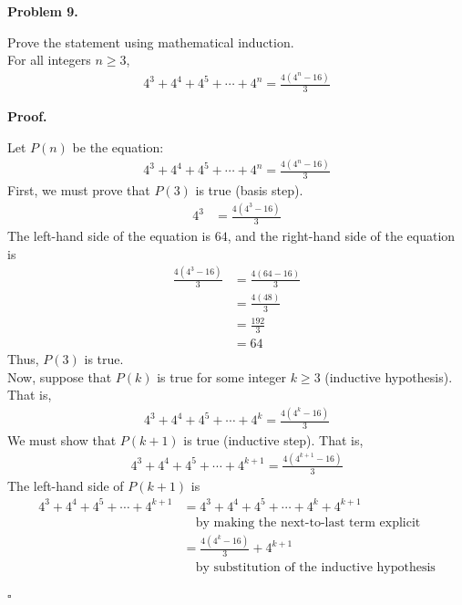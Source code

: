 \documentclass{article}
\newenvironment{problem}[1]{
    \begin{mdframed}[backgroundcolor=gray!20, skipabove=\baselineskip, skipbelow=\baselineskip, nobreak=true, innerleftmargin=10pt, innerrightmargin=10pt, innertopmargin=10pt, innerbottommargin=10pt]
    \textbf{Problem #1.}
}{
    \end{mdframed}
}
\newenvironment{proof}{
    \begin{mdframed}[nobreak=false, innerleftmargin=10pt, innerrightmargin=10pt, innertopmargin=10pt, innerbottommargin=10pt]
    \textbf{Proof.}
}{
    \hfill $\square$
    \end{mdframed}
}
\begin{document}
    \begin{problem}{9}
        Prove the statement using mathematical induction. \\
        For all integers $n \geq 3$,
        \begin{align*}
            4^3 + 4^4 + 4^5 + \cdots + 4^n = \frac{4(4^n-16)}{3}
        \end{align*}
    \end{problem}
    \begin{proof}
        Let $P(n)$ be the equation:
        \begin{align*}
            4^3 + 4^4 + 4^5 + \cdots + 4^n = \frac{4(4^n-16)}{3}
        \end{align*}
        First, we must prove that $P(3)$ is true (basis step).
        \begin{align*}
            4^3 &= \frac{4(4^3-16)}{3}
        \end{align*}
        The left-hand side of the equation is $64$, and the right-hand side of the equation is
        \begin{align*}
            \frac{4(4^3-16)}{3} &= \frac{4(64-16)}{3} \\
            &= \frac{4(48)}{3} \\
            &= \frac{192}{3} \\
            &= 64
        \end{align*}
        Thus, $P(3)$ is true. \\
        Now, suppose that $P(k)$ is true for some integer $k \geq 3$ (inductive hypothesis). That is,
        \begin{align*}
            4^3 + 4^4 + 4^5 + \cdots + 4^k = \frac{4(4^k-16)}{3}
        \end{align*}
        We must show that $P(k+1)$ is true (inductive step). That is,
        \begin{align*}
            4^3 + 4^4 + 4^5 + \cdots + 4^{k+1} = \frac{4(4^{k+1}-16)}{3}
        \end{align*}
        The left-hand side of $P(k+1)$ is
        \begin{align*}
            4^3 + 4^4 + 4^5 + \cdots + 4^{k+1} &= 4^3 + 4^4 + 4^5 + \cdots + 4^k + 4^{k+1} \\
            & \quad \text{by making the next-to-last term explicit} \\
            &= \frac{4(4^k-16)}{3} + 4^{k+1} \\
            & \quad \text{by substitution of the inductive hypothesis} \\

\end{align*}
\end{proof}
\end{document}

